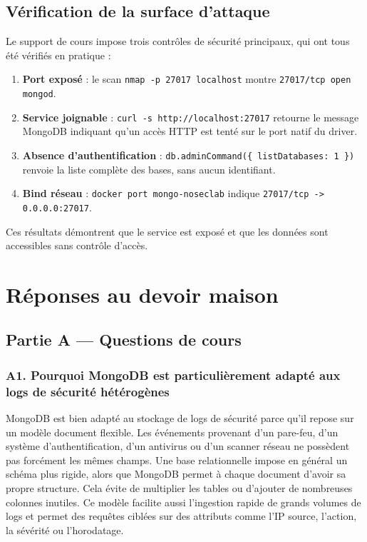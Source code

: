 \documentclass[11pt,a4paper]{article}
\begin{document}
\subsection{Vérification de la surface d'attaque}

Le support de cours impose trois contrôles de sécurité principaux, qui ont tous été vérifiés en pratique :

\begin{enumerate}[label=\alph*)]
  \item \textbf{Port exposé} : le scan \texttt{nmap -p 27017 localhost} montre \texttt{27017/tcp open mongod}.
  \item \textbf{Service joignable} : \texttt{curl -s http://localhost:27017} retourne le message MongoDB indiquant qu'un accès HTTP est tenté sur le port natif du driver.
  \item \textbf{Absence d'authentification} : \texttt{db.adminCommand(\{ listDatabases: 1 \})} renvoie la liste complète des bases, sans aucun identifiant.
  \item \textbf{Bind réseau} : \texttt{docker port mongo-noseclab} indique \texttt{27017/tcp -> 0.0.0.0:27017}.
\end{enumerate}

Ces résultats démontrent que le service est exposé et que les données sont accessibles sans contrôle d'accès.

\section{Réponses au devoir maison}

\subsection{Partie A --- Questions de cours}

\subsubsection*{A1. Pourquoi MongoDB est particulièrement adapté aux logs de sécurité hétérogènes}

MongoDB est bien adapté au stockage de logs de sécurité parce qu'il repose sur un modèle document flexible. Les événements provenant d'un pare-feu, d'un système d'authentification, d'un antivirus ou d'un scanner réseau ne possèdent pas forcément les mêmes champs. Une base relationnelle impose en général un schéma plus rigide, alors que MongoDB permet à chaque document d'avoir sa propre structure. Cela évite de multiplier les tables ou d'ajouter de nombreuses colonnes inutiles. Ce modèle facilite aussi l'ingestion rapide de grands volumes de logs et permet des requêtes ciblées sur des attributs comme l'IP source, l'action, la sévérité ou l'horodatage.
\end{document}
